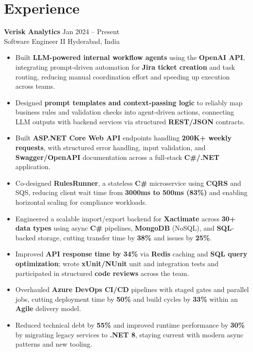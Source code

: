 \documentclass[10pt,letterpaper]{article}
\newcommand{\resumeSubheading}[4]{%
  \textbf{#1} \hfill #2 \\
  #3 \hfill #4 \\
}
\begin{document}
\section*{Experience}
\resumeSubheading{Verisk Analytics}{Jan 2024 -- Present}{Software Engineer II}{Hyderabad, India}
\begin{itemize}
    \item Built \textbf{LLM-powered internal workflow agents} using the \textbf{OpenAI API}, integrating prompt-driven automation for \textbf{Jira ticket creation} and task routing, reducing manual coordination effort and speeding up execution across teams.
    \item Designed \textbf{prompt templates and context-passing logic} to reliably map business rules and validation checks into agent-driven actions, connecting LLM outputs with backend services via structured \textbf{REST/JSON} contracts.
    \item Built \textbf{ASP.NET Core Web API} endpoints handling \textbf{200K+ weekly requests}, with structured error handling, input validation, and \textbf{Swagger/OpenAPI} documentation across a full-stack \textbf{C\#/.NET} application.
    \item Co-designed \textbf{RulesRunner}, a stateless \textbf{C\#} microservice using \textbf{CQRS} and SQS, reducing client wait time from \textbf{3000ms to 500ms (83\%)} and enabling horizontal scaling for compliance workloads.
    \item Engineered a scalable import/export backend for \textbf{Xactimate} across \textbf{30+ data types} using async \textbf{C\#} pipelines, \textbf{MongoDB} (NoSQL), and \textbf{SQL}-backed storage, cutting transfer time by \textbf{38\%} and issues by \textbf{25\%}.
    \item Improved \textbf{API response time by 34\%} via \textbf{Redis} caching and \textbf{SQL query optimization}; wrote \textbf{xUnit/NUnit} unit and integration tests and participated in structured \textbf{code reviews} across the team.
    \item Overhauled \textbf{Azure DevOps CI/CD} pipelines with staged gates and parallel jobs, cutting deployment time by \textbf{50\%} and build cycles by \textbf{33\%} within an \textbf{Agile} delivery model.
    \item Reduced technical debt by \textbf{55\%} and improved runtime performance by \textbf{30\%} by migrating legacy services to \textbf{.NET 8}, staying current with modern async patterns and new tooling.
\end{itemize}
\end{document}
